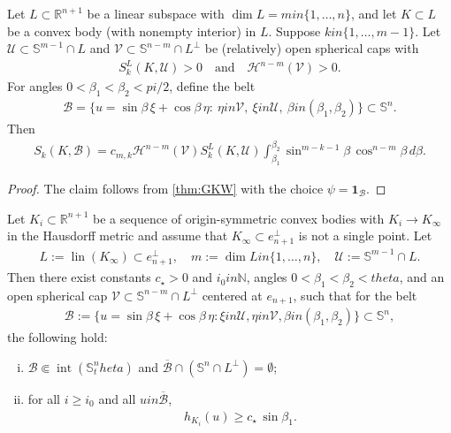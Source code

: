 \documentclass[12pt]{amsart}
\def\theta{theta}%
\def\pi{pi}%
\def\in{in }%
\numberwithin{equation}{section}
\newcommand{\bbN}{\mathbb{N}}
\newcommand{\bbR}{\mathbb{R}}
\newcommand{\bbS}{\mathbb{S}}
\newcommand{\op}[1]{\operatorname{#1}}
\newcommand{\8}{\infty}
\newcommand{\cB}{\mathcal{B}}
\newcommand{\cH}{\mathcal{H}}
\newcommand{\eq}[1]{\begin{equation}\begin{alignedat}{2}#1\end{alignedat}\end{equation}}
\begin{document}
\begin{lemma}\label{lem:belt-lower-estimate}
Let $L\subset\mathbb{R}^{n+1}$ be a linear subspace with $\dim L=m\in\{1,\dots,n\}$, and let
$K\subset L$ be a convex body (with nonempty interior) in $L$.
Suppose $k\in\{1,\dots,m-1\}$. Let $\mathcal{U}\subset\mathbb{S}^{m-1}\cap L$ and $\mathcal{V}\subset\mathbb{S}^{n-m}\cap L^\perp$ be (relatively) open spherical caps with
\eq{
S_k^L(K,\mathcal{U})>0\quad\text{and}\quad \cH^{n-m}(\mathcal{V})>0.
}
For angles $0<\beta_1<\beta_2<\pi/2$, define the belt
\eq{
\mathcal{B}=\bigl\{u=\sin\beta\,\xi+\cos\beta\,\eta:\ \eta\in \mathcal{V},\ \xi\in \mathcal{U},\ \beta\in (\beta_1,\beta_2)\bigr\}
\subset \mathbb{S}^n.
}
Then
\eq{
S_k(K,\cB)
= c_{m,k}\cH^{n-m}(\mathcal{V})S_k^L(K,\mathcal{U})
  \int_{\beta_1}^{\beta_2} \sin^{m-k-1}\beta\,\cos^{n-m}\beta\,d\beta.
}
\end{lemma}

\begin{proof}
The claim follows from \autoref{thm:GKW} with the choice $\psi=\mathbf{1}_{\mathcal{B}}$.
\end{proof}

\begin{lemma}\label{lem:belt-control}
Let $K_i\subset\bbR^{n+1}$ be a sequence of origin-symmetric convex bodies with
$K_i\to K_\infty$ in the Hausdorff metric and assume that
$K_\infty\subset e_{n+1}^\perp$ is not a single point. Let
\eq{
L:=\op{lin}(K_\infty)\subset e_{n+1}^\perp,\quad m:=\dim L\in\{1,\dots,n\},\quad
\mathcal U:=\bbS^{m-1}\cap L.
}
Then there exist constants $c_\star>0$ and $i_0\in\bbN$, angles
$0<\beta_1<\beta_2<\theta$, and an open spherical cap
$\mathcal V\subset\bbS^{n-m}\cap L^\perp$ centered at $e_{n+1}$, such that
for the belt
\eq{
\mathcal B
:=\bigl\{u=\sin\beta\,\xi+\cos\beta\,\eta: \xi\in\mathcal U, \eta\in\mathcal V, \beta\in(\beta_1,\beta_2)\bigr\}\subset\bbS^n,
}
the following hold:
\begin{enumerate}[(i)]
\item $\mathcal B\Subset \op{int}(\bbS^n_\theta)$ and
      $\overline{\mathcal B}\cap(\bbS^n\cap L^\perp)=\emptyset$;
\item for all $i\ge i_0$ and all $u\in\overline{\mathcal B}$,
\eq{\label{eq:belt-LB}
h_{K_i}(u)\ge c_\star\,\sin\beta_1.
}
\end{enumerate}
\end{lemma}
\end{document}
